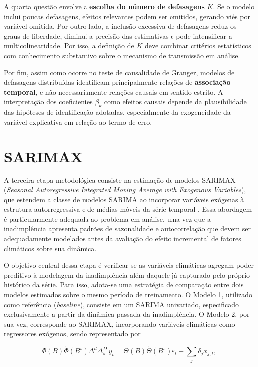 A quarta questão envolve a \textbf{escolha do número de defasagens} $K$. Se o modelo
inclui poucas defasagens, efeitos relevantes podem ser omitidos, gerando viés por
variável omitida. Por outro lado, a inclusão excessiva de defasagens reduz os graus
de liberdade, diminui a precisão das estimativas e pode intensificar a
multicolinearidade. Por isso, a definição de $K$ deve combinar critérios
estatísticos com conhecimento substantivo sobre o mecanismo de transmissão em
análise.

Por fim, assim como ocorre no teste de causalidade de Granger, modelos de
defasagens distribuídas identificam principalmente relações de
\textbf{associação temporal}, e não necessariamente relações causais em sentido
estrito. A interpretação dos coeficientes $\beta_k$ como efeitos causais depende da
plausibilidade das hipóteses de identificação adotadas, especialmente da
exogeneidade da variável explicativa em relação ao termo de erro.


\section{SARIMAX}

A terceira etapa metodológica consiste na estimação de modelos SARIMAX (\textit{Seasonal Autoregressive Integrated Moving Average with Exogenous Variables}), que estendem a classe de modelos SARIMA ao incorporar variáveis exógenas à estrutura autorregressiva e de médias móveis da série temporal \citep{box2015}. Essa abordagem é particularmente adequada ao problema em análise, uma vez que a inadimplência apresenta padrões de sazonalidade e autocorrelação que devem ser adequadamente modelados antes da avaliação do efeito incremental de fatores climáticos sobre sua dinâmica.

O objetivo central dessa etapa é verificar se as variáveis climáticas agregam poder preditivo à modelagem da inadimplência além daquele já capturado pelo próprio histórico da série. Para isso, adota-se uma estratégia de comparação entre dois modelos estimados sobre o mesmo período de treinamento. O Modelo 1, utilizado como referência (\textit{baseline}), consiste em um SARIMA univariado, especificado exclusivamente a partir da dinâmica passada da inadimplência. O Modelo 2, por sua vez, corresponde ao SARIMAX, incorporando variáveis climáticas como regressores exógenos, sendo representado por

\begin{equation}
    \Phi(B)\tilde{\Phi}(B^s)\Delta^d\Delta_s^D \, y_t = \Theta(B)\tilde{\Theta}(B^s)\varepsilon_t + \sum_{j} \delta_j x_{j,t} ,
\end{equation}

